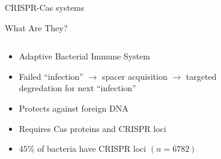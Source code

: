 \documentclass[dvipsnames]{beamer}
\begin{document}
\begin{frame}{}%
    \begin{center}
        \Huge \textcolor{OliveGreen}{CRISPR-Cas systems}
    \end{center}
    \addtocounter{framenumber}{-1}
\end{frame}
\begin{frame}[fragile]{What Are They?}
    \begin{columns}
    \begin{column}{0.5\textwidth}
        \begin{itemize}
            \item<2-> Adaptive Bacterial Immune System
            \item<3-> Failed “infection” $\to$ spacer acquisition $\to$ targeted degredation for next “infection”
            \item<4-> Protects against foreign DNA
            \item<5-> Requires Cas proteins and CRISPR loci
            \item<6-> $45\%$ of bacteria have CRISPR loci $(n=6782)$ \autocite{crispdb}
        \end{itemize}
    \end{column}
    \begin{column}{0.5\textwidth}
        \begin{figure}[htb!]
            \autocite{crispgen}
        \end{figure}
    \end{column}
    \end{columns}
\end{frame}
\end{document}

